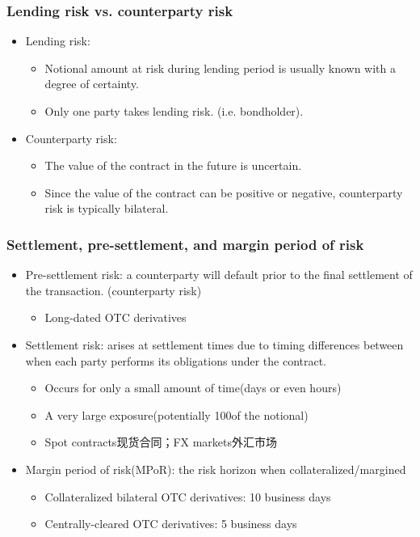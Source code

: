 \subsubsection{Lending risk vs. counterparty risk}
\begin{itemize}
\item Lending risk:
\begin{itemize}
    \item Notional amount at risk during lending period is usually known with a degree of certainty.
    \item Only one party takes lending risk. (i.e. bondholder).
\end{itemize}
 \item Counterparty risk:
\begin{itemize}
    \item The value of the contract in the future is uncertain.
    \item Since the value of the contract can be positive or negative, counterparty risk is typically bilateral.
\end{itemize}
\end{itemize}


\subsubsection{Settlement, pre-settlement, and margin period of risk}
\begin{itemize}
    \item Pre-settlement risk: a counterparty will default prior to the final settlement of the transaction. (counterparty risk)
    \begin{itemize}
    \item Long-dated OTC derivatives
    \end{itemize}
     \item Settlement risk: arises at settlement times due to timing differences between when each party performs its obligations under the contract.
    \begin{itemize}
    \item Occurs for only a small amount of time(days or even hours)
    \item A very large exposure(potentially 100of the notional)
    \item Spot contracts现货合同；FX markets外汇市场
    \end{itemize}

    \item Margin period of risk(MPoR): the risk horizon when
    collateralized/margined

    \begin{itemize}
    \item Collateralized bilateral OTC derivatives: 10 business days
    \item Centrally-cleared OTC derivatives: 5 business days
    \end{itemize}



\end{itemize}

